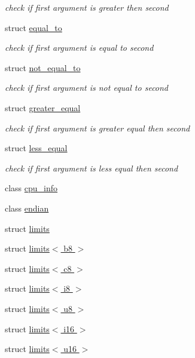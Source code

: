 \begin{DoxyCompactItemize}
\begin{DoxyCompactList}\small\item\em check if first argument is greater then second \end{DoxyCompactList}\item 
struct \hyperlink{structcrap_1_1equal__to}{equal\-\_\-to}
\begin{DoxyCompactList}\small\item\em check if first argument is equal to second \end{DoxyCompactList}\item 
struct \hyperlink{structcrap_1_1not__equal__to}{not\-\_\-equal\-\_\-to}
\begin{DoxyCompactList}\small\item\em check if first argument is not equal to second \end{DoxyCompactList}\item 
struct \hyperlink{structcrap_1_1greater__equal}{greater\-\_\-equal}
\begin{DoxyCompactList}\small\item\em check if first argument is greater equal then second \end{DoxyCompactList}\item 
struct \hyperlink{structcrap_1_1less__equal}{less\-\_\-equal}
\begin{DoxyCompactList}\small\item\em check if first argument is less equal then second \end{DoxyCompactList}\item 
class \hyperlink{classcrap_1_1cpu__info}{cpu\-\_\-info}
\item 
class \hyperlink{classcrap_1_1endian}{endian}
\item 
struct \hyperlink{structcrap_1_1limits}{limits}
\item 
struct \hyperlink{structcrap_1_1limits_3_01b8_01_4}{limits$<$ b8 $>$}
\item 
struct \hyperlink{structcrap_1_1limits_3_01c8_01_4}{limits$<$ c8 $>$}
\item 
struct \hyperlink{structcrap_1_1limits_3_01i8_01_4}{limits$<$ i8 $>$}
\item 
struct \hyperlink{structcrap_1_1limits_3_01u8_01_4}{limits$<$ u8 $>$}
\item 
struct \hyperlink{structcrap_1_1limits_3_01i16_01_4}{limits$<$ i16 $>$}
\item 
struct \hyperlink{structcrap_1_1limits_3_01u16_01_4}{limits$<$ u16 $>$}
\item 

\end{DoxyCompactItemize}
